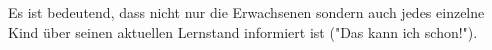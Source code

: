 Es ist bedeutend, dass nicht nur die Erwachsenen sondern auch jedes einzelne Kind über seinen aktuellen Lernstand informiert ist ("Das kann ich schon!").
